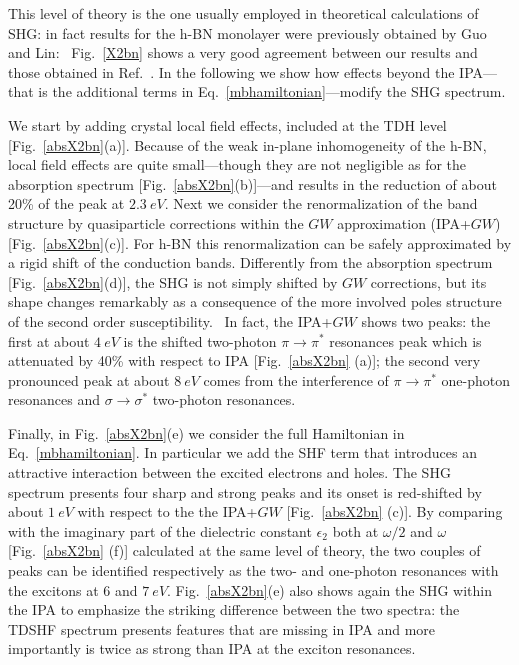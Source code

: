 This level of theory is the one usually employed in theoretical calculations of SHG: in fact results for the h-BN monolayer were previously obtained by Guo and Lin:~\cite{guo2005second} Fig.~\ref{X2bn} shows a very good agreement between our results and those obtained in Ref.~\cite{guo2005second}. In the following we show how effects beyond the IPA---that is the additional terms in Eq.~\eqref{mbhamiltonian}---modify the SHG spectrum.        

We start by adding crystal local field effects, included at the TDH level [Fig.~\ref{absX2bn}(a)]. Because of the weak in-plane inhomogeneity of the h-BN, local field effects are quite small---though they are not negligible as for the absorption spectrum  [Fig.~\ref{absX2bn}(b)]---and results in the reduction of about 20\% of the peak at $2.3~eV$. Next we consider the renormalization of the band structure by quasiparticle corrections within the $GW$ approximation (IPA+$GW$) [Fig.~\ref{absX2bn}(c)]. For h-BN this renormalization can be safely approximated by a rigid shift of the conduction bands. Differently from the absorption spectrum [Fig.~\ref{absX2bn}(d)], the SHG is not simply shifted by $GW$ corrections, but its shape changes remarkably as a consequence of the more involved poles structure of the second order susceptibility.~\cite{PhysRevB.82.235201,hughes1996calculation}
In fact, the IPA+$GW$ shows two peaks: the first at about $4~eV$ is the shifted two-photon $\pi \to \pi^*$  resonances peak which is attenuated by 40\% with respect to IPA  [Fig.~\ref{absX2bn} (a)]; the second very pronounced peak at about $8~eV$ comes from the interference of  $\pi \to \pi^*$  one-photon resonances and  $\sigma \to \sigma^*$ two-photon resonances.  

Finally, in Fig.~\ref{absX2bn}(e) we consider the full Hamiltonian in Eq.~\eqref{mbhamiltonian}. In particular we add the SHF term that introduces an attractive interaction between the excited electrons and holes.\cite{strinati} The SHG spectrum presents four sharp and strong peaks and its onset is red-shifted by about $1~eV$ with respect to the the IPA+$GW$ [Fig.~\ref{absX2bn} (c)]. By comparing with the imaginary part of the dielectric constant $\epsilon_2$ both at $\omega/2$ and  $\omega$ [Fig.~\ref{absX2bn} (f)] calculated at the same level of theory, the two couples of peaks can be identified respectively as the two- and one-photon resonances with the excitons at $6$ and $7~eV$.  Fig.~\ref{absX2bn}(e) also shows again the SHG within the IPA to emphasize the striking difference between the two spectra: the TDSHF spectrum presents features that are missing in IPA and more importantly is twice as strong than IPA at the exciton resonances. 

